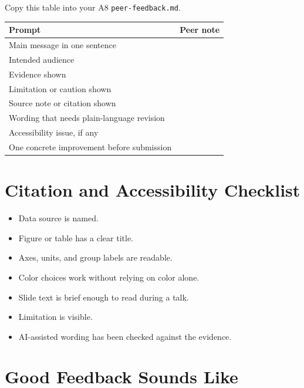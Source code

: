 \documentclass[
  letterpaper,
  DIV=11,
  numbers=noendperiod,
  oneside]{scrreprt}
\providecommand{\tightlist}{%
  \setlength{\itemsep}{0pt}\setlength{\parskip}{0pt}}
\begin{document}
Copy this table into your A8 \texttt{peer-feedback.md}.

\begin{longtable}[]{@{}ll@{}}
\toprule\noalign{}
Prompt & Peer note \\
\midrule\noalign{}
\endhead
\bottomrule\noalign{}
\endlastfoot
Main message in one sentence & \\
Intended audience & \\
Evidence shown & \\
Limitation or caution shown & \\
Source note or citation shown & \\
Wording that needs plain-language revision & \\
Accessibility issue, if any & \\
One concrete improvement before submission & \\
\end{longtable}

\section*{Citation and Accessibility
Checklist}\label{citation-and-accessibility-checklist}


\begin{itemize}
\tightlist
\item
  Data source is named.
\item
  Figure or table has a clear title.
\item
  Axes, units, and group labels are readable.
\item
  Color choices work without relying on color alone.
\item
  Slide text is brief enough to read during a talk.
\item
  Limitation is visible.
\item
  AI-assisted wording has been checked against the evidence.
\end{itemize}

\section*{Good Feedback Sounds Like}\label{good-feedback-sounds-like}

\end{document}
